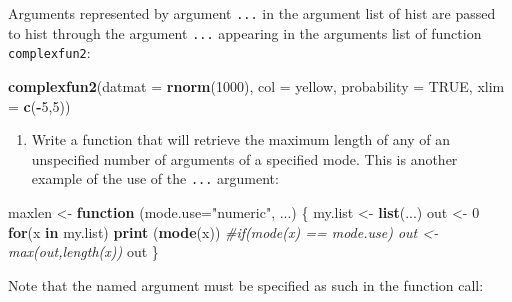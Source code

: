 \documentclass[
]{book}
\newenvironment{Shaded}{\begin{snugshade}}{\end{snugshade}}
\newcommand{\AttributeTok}[1]{\textcolor[rgb]{0.13,0.29,0.53}{#1}}
\newcommand{\CommentTok}[1]{\textcolor[rgb]{0.56,0.35,0.01}{\textit{#1}}}
\newcommand{\ConstantTok}[1]{\textcolor[rgb]{0.56,0.35,0.01}{#1}}
\newcommand{\ControlFlowTok}[1]{\textcolor[rgb]{0.13,0.29,0.53}{\textbf{#1}}}
\newcommand{\DecValTok}[1]{\textcolor[rgb]{0.00,0.00,0.81}{#1}}
\newcommand{\FunctionTok}[1]{\textcolor[rgb]{0.13,0.29,0.53}{\textbf{#1}}}
\newcommand{\NormalTok}[1]{#1}
\newcommand{\OtherTok}[1]{\textcolor[rgb]{0.56,0.35,0.01}{#1}}
\newcommand{\SpecialCharTok}[1]{\textcolor[rgb]{0.81,0.36,0.00}{\textbf{#1}}}
\newcommand{\StringTok}[1]{\textcolor[rgb]{0.31,0.60,0.02}{#1}}
\providecommand{\tightlist}{%
  \setlength{\itemsep}{0pt}\setlength{\parskip}{0pt}}
\begin{document}
Arguments represented by argument \texttt{...} in the argument list of hist are passed to hist through the argument \texttt{...} appearing in the arguments list of function \texttt{complexfun2}:

\begin{Shaded}
\begin{Highlighting}[]
\FunctionTok{complexfun2}\NormalTok{(}\AttributeTok{datmat =} \FunctionTok{rnorm}\NormalTok{(}\DecValTok{1000}\NormalTok{), }\AttributeTok{col =} \StringTok{\textquotesingle{}yellow\textquotesingle{}}\NormalTok{, }
        \AttributeTok{probability =} \ConstantTok{TRUE}\NormalTok{, }\AttributeTok{xlim =} \FunctionTok{c}\NormalTok{(}\SpecialCharTok{{-}}\DecValTok{5}\NormalTok{,}\DecValTok{5}\NormalTok{))}
\end{Highlighting}
\end{Shaded}

\begin{enumerate}
\def\labelenumi{(\alph{enumi})}
\setcounter{enumi}{1}
\tightlist
\item
  Write a function that will retrieve the maximum length of any of an unspecified number of arguments of a specified mode. This is another example of the use of the \texttt{...} argument:
\end{enumerate}

\begin{Shaded}
\begin{Highlighting}[]
\NormalTok{maxlen }\OtherTok{\textless{}{-}} \ControlFlowTok{function}\NormalTok{ (}\AttributeTok{mode.use=}\StringTok{"numeric"}\NormalTok{, ...) }
\NormalTok{  \{ my.list }\OtherTok{\textless{}{-}} \FunctionTok{list}\NormalTok{(...)}
\NormalTok{    out }\OtherTok{\textless{}{-}} \DecValTok{0}
    \ControlFlowTok{for}\NormalTok{(x }\ControlFlowTok{in}\NormalTok{ my.list) }
      \FunctionTok{print}\NormalTok{ (}\FunctionTok{mode}\NormalTok{(x)) }\CommentTok{\#if(mode(x) == mode.use) out \textless{}{-} max(out,length(x))}
\NormalTok{    out}
\NormalTok{  \}}
\end{Highlighting}
\end{Shaded}

Note that the named argument must be specified as such in the function call:
\end{document}
